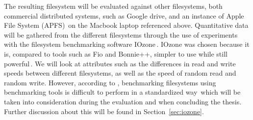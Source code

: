 The resulting filesystem will be evaluated against other filesystems, both commercial distributed systems, such as Google drive, and an instance of Apple File System (APFS)\,\cite{appleAppleFileSystem} on the Macbook laptop referenced above. Quantitative data will be gathered from the different filesystems through the use of experiments with the filesystem benchmarking software IOzone\,\cite{IozoneFilesystemBenchmark}. IOzone was chosen because it is, compared to tools such as Fio and Bonnie++, simpler to use while still powerful\,\cite{agarwalComparingIOBenchmarks2018}. We will look at attributes such as the differences in read and write speeds between different filesystems, as well as the speed of random read and random write. However, according to \citeauthor{tarasovBenchmarkingFileSystem2011}, benchmarking filesystems using benchmarking tools is difficult to perform in a standardized way\,\cite{tarasovBenchmarkingFileSystem2011} which will be taken into consideration during the evaluation and when concluding the thesis. Further discussion about this will be found in Section~\ref{sec:iozone}.